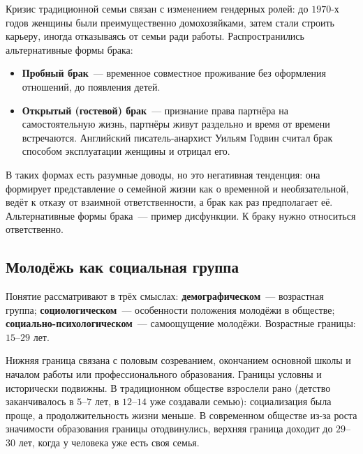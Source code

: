 \documentclass[12pt]{article}
\begin{document}
	Кризис традиционной семьи связан с изменением гендерных ролей: до $1970$-х годов женщины были преимущественно домохозяйками, затем стали строить карьеру, иногда отказываясь от семьи ради работы. Распространились альтернативные формы брака:
	\begin{itemize}
		\item \textbf{Пробный брак}~--- временное совместное проживание без оформления отношений, до появления детей.
		\item \textbf{Открытый (гостевой) брак}~--- признание права партнёра на самостоятельную жизнь, партнёры живут раздельно и время от времени встречаются. Английский писатель-анархист Уильям Годвин считал брак способом эксплуатации женщины и отрицал его.
	\end{itemize}

	\begin{note}
		В таких формах есть разумные доводы, но это негативная тенденция: она формирует представление о семейной жизни как о временной и необязательной, ведёт к отказу от взаимной ответственности, а брак как раз предполагает её. Альтернативные формы брака~--- пример дисфункции. К браку нужно относиться ответственно.
	\end{note}

	\subsection{Молодёжь как социальная группа}

	\begin{definition}[Молодёжь]
		Понятие рассматривают в трёх смыслах: \textbf{демографическом}~--- возрастная группа; \textbf{социологическом}~--- особенности положения молодёжи в обществе; \textbf{социально-психологическом}~--- самоощущение молодёжи. Возрастные границы: $15$--$29$ лет.
	\end{definition}

	\begin{note}
		Нижняя граница связана с половым созреванием, окончанием основной школы и началом работы или профессионального образования. Границы условны и исторически подвижны. В традиционном обществе взрослели рано (детство заканчивалось в $5$--$7$ лет, в $12$--$14$ уже создавали семью): социализация была проще, а продолжительность жизни меньше. В современном обществе из-за роста значимости образования границы отодвинулись, верхняя граница доходит до $29$--$30$ лет, когда у человека уже есть своя семья.
	\end{note}
\end{document}
